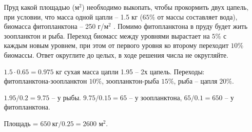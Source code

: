 
Пруд
какой площадью (м$^2$) необходимо выкопать, чтобы прокормить двух
цапель, при условии, что масса одной цапли – 1.5 кг ($65\%$ от массы составляет
вода), биомасса фитопланктона – 250 г/м$^2$ . Помимо фитопланктона в
пруду будет жить зоопланктон и рыба. Переход биомасс между уровнями вырастает
на $5\%$ с каждым новым уровнем, при этом от первого уровня ко второму переходит
$10\%$ биомассы. Ответ округлите до целых, в ходе решения числа не округляйте.

\solutionSection

$1.5 \cdot 0.65=0.975$ кг сухая масса цапли 1.95 – 2х цапель. 
Переходы: фитопланктона-зоопланктон $10\%$, зоопланктон-рыба $15\%$, рыба – цапля $20\%$. 

$1.95/0.2=9.75$ – у рыбы. $9.75/0.15 = 65$ – у зоопланктона, $65/0.1=650$ – у фитопланктона. 

Площадь = $650 \: \text{кг}/0.25=2600$ м$^2$.

